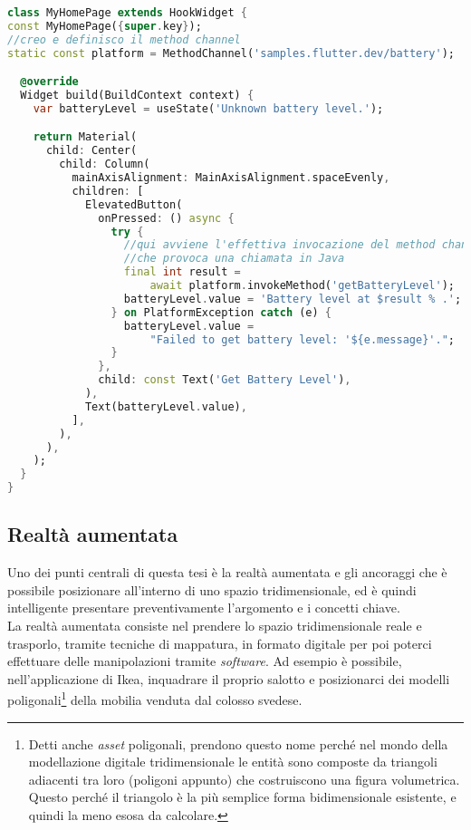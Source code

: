 \begin{lstlisting}[language=dart, firstnumber=1,caption={Dart \textit{main}}]
class MyHomePage extends HookWidget {
const MyHomePage({super.key});
//creo e definisco il method channel
static const platform = MethodChannel('samples.flutter.dev/battery');

  @override
  Widget build(BuildContext context) {
    var batteryLevel = useState('Unknown battery level.');

    return Material(
      child: Center(
        child: Column(
          mainAxisAlignment: MainAxisAlignment.spaceEvenly,
          children: [
            ElevatedButton(
              onPressed: () async {
                try {
                  //qui avviene l'effettiva invocazione del method channel
                  //che provoca una chiamata in Java
                  final int result =
                      await platform.invokeMethod('getBatteryLevel');
                  batteryLevel.value = 'Battery level at $result % .';
                } on PlatformException catch (e) {
                  batteryLevel.value =
                      "Failed to get battery level: '${e.message}'.";
                }
              },
              child: const Text('Get Battery Level'),
            ),
            Text(batteryLevel.value),
          ],
        ),
      ),
    );
  }
}
\end{lstlisting}


\subsection{Realtà aumentata}
Uno dei punti centrali di questa tesi è la realtà aumentata e gli ancoraggi che è possibile posizionare all'interno di uno spazio tridimensionale, ed è quindi intelligente presentare preventivamente l'argomento e i concetti chiave.\\
La realtà aumentata consiste nel prendere lo spazio tridimensionale reale e trasporlo, tramite tecniche di mappatura, in formato digitale per poi poterci effettuare delle manipolazioni tramite \textit{software}. Ad esempio è possibile, nell'applicazione di Ikea, inquadrare il proprio salotto e posizionarci dei modelli poligonali\footnote{Detti anche \textit{asset} poligonali, prendono questo nome perché nel mondo della modellazione digitale tridimensionale le entità sono composte da triangoli adiacenti tra loro (poligoni appunto) che costruiscono una figura volumetrica. Questo perché il triangolo è la più semplice forma bidimensionale esistente, e quindi la meno esosa da calcolare.} della mobilia venduta dal colosso svedese.\\

